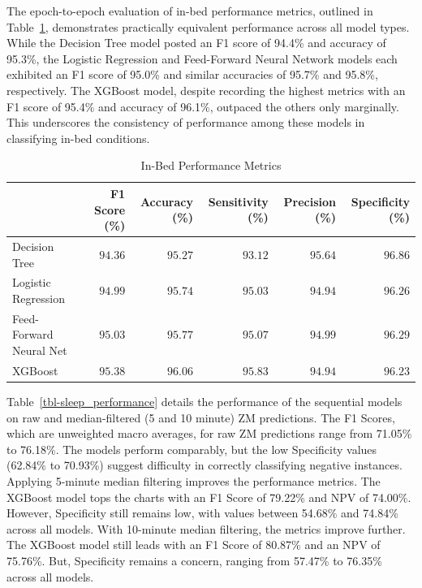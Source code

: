 \documentclass[
  super,
  preprint,
  3p]{elsarticle}
\begin{document}
The epoch-to-epoch evaluation of in-bed performance metrics, outlined in
Table~\ref{tbl-in_bed_performance}, demonstrates practically equivalent
performance across all model types. While the Decision Tree model posted
an F1 score of 94.4\% and accuracy of 95.3\%, the Logistic Regression
and Feed-Forward Neural Network models each exhibited an F1 score of
95.0\% and similar accuracies of 95.7\% and 95.8\%, respectively. The
XGBoost model, despite recording the highest metrics with an F1 score of
95.4\% and accuracy of 96.1\%, outpaced the others only marginally. This
underscores the consistency of performance among these models in
classifying in-bed conditions.

\hypertarget{tbl-in_bed_performance}{}
\begin{longtable}{lrrrrr}
\caption{\label{tbl-in_bed_performance}In-Bed Performance Metrics }\tabularnewline

\toprule
 & F1 Score (\%) & Accuracy (\%) & Sensitivity (\%) & Precision (\%) & Specificity (\%) \\ 
\midrule
Decision Tree & $94.36$ & $95.27$ & $93.12$ & $95.64$ & $96.86$ \\ 
Logistic Regression & $94.99$ & $95.74$ & $95.03$ & $94.94$ & $96.26$ \\ 
Feed-Forward Neural Net & $95.03$ & $95.77$ & $95.07$ & $94.99$ & $96.29$ \\ 
XGBoost & $95.38$ & $96.06$ & $95.83$ & $94.94$ & $96.23$ \\ 
\bottomrule
\end{longtable}

Table~\ref{tbl-sleep_performance} details the performance of the
sequential models on raw and median-filtered (5 and 10 minute) ZM
predictions. The F1 Scores, which are unweighted macro averages, for raw
ZM predictions range from 71.05\% to 76.18\%. The models perform
comparably, but the low Specificity values (62.84\% to 70.93\%) suggest
difficulty in correctly classifying negative instances. Applying
5-minute median filtering improves the performance metrics. The XGBoost
model tops the charts with an F1 Score of 79.22\% and NPV of 74.00\%.
However, Specificity still remains low, with values between 54.68\% and
74.84\% across all models. With 10-minute median filtering, the metrics
improve further. The XGBoost model still leads with an F1 Score of
80.87\% and an NPV of 75.76\%. But, Specificity remains a concern,
ranging from 57.47\% to 76.35\% across all models.
\end{document}
